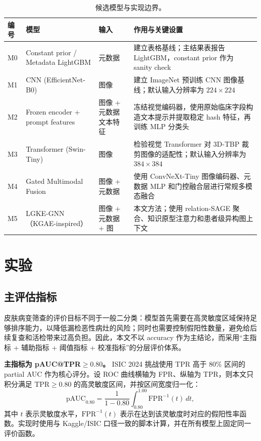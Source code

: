 \documentclass[UTF8,a4paper,10pt,twocolumn,fontset=fandol]{ctexart}
\newcommand{\modelname}{LGKE-GNN}
\begin{document}
\begin{table}[t]
\centering
\small
\caption{候选模型与实现边界。}
\label{tab:models}
\begin{tabularx}{\textwidth}{L{1.1cm}L{2.6cm}L{2.3cm}Y}
\toprule
编号 & 模型 & 输入 & 作用与关键设置 \\
\midrule
M0 & Constant prior / Metadata LightGBM & 元数据 & 建立表格基线；主结果表报告 LightGBM，constant prior 作为 sanity check \\
M1 & CNN (EfficientNet-B0) & 图像 & 建立 ImageNet 预训练 CNN 图像基线；默认输入分辨率为 $224\times224$ \\
M2 & Frozen encoder + prompt features & 图像 + 元数据文本特征 & 冻结视觉编码器，使用原始临床字段构造文本提示并提取稳定 hash 特征，再训练 MLP 分类头 \\
M3 & Transformer (Swin-Tiny) & 图像 & 检验视觉 Transformer 对 3D-TBP 裁剪图像的适配性；默认输入分辨率为 $384\times384$ \\
M4 & Gated Multimodal Fusion & 图像 + 元数据 & 使用 ConvNeXt-Tiny 图像编码器、元数据 MLP 和门控融合层进行常规多模态融合 \\
M5 & \modelname{}（KGAE-inspired） & 图像 + 元数据 + 图 & 本文方法；使用 relation-SAGE 聚合、知识原型注意力和患者级异构图上下文 \\
\bottomrule
\end{tabularx}
\end{table}

\section{实验}
\subsection{主评估指标}
皮肤病变筛查的评价目标不同于一般二分类：模型首先需要在高灵敏度区域保持足够排序能力，以降低漏检恶性病灶的风险；同时也需要控制假阳性数量，避免给后续复查和活检带来过高负担。因此，本文不以 accuracy 作为主结论，而采用“主指标 + 辅助指标 + 阈值指标 + 校准指标”的分层评价体系。

\textbf{主指标为 pAUC@TPR$\geq0.80$。} ISIC 2024 挑战使用 TPR 高于 80\% 区间的 partial AUC 作为核心评分\cite{kaggleisic2024,isic2024challenge}。设 ROC 曲线横轴为 FPR、纵轴为 TPR，则本文只积分满足 $\mathrm{TPR}\geq0.80$ 的高灵敏度区间，并按区间宽度归一化：
\begin{equation}
    \mathrm{pAUC}_{0.80}=
    \frac{1}{1-0.80}\int_{0.80}^{1.00} \mathrm{FPR}^{-1}(t)\,dt,
\end{equation}
其中 $t$ 表示灵敏度水平，$\mathrm{FPR}^{-1}(t)$ 表示在达到该灵敏度时对应的假阳性率函数。实现时使用与 Kaggle/ISIC 口径一致的脚本计算，并在所有模型上固定同一评价函数。
\end{document}
